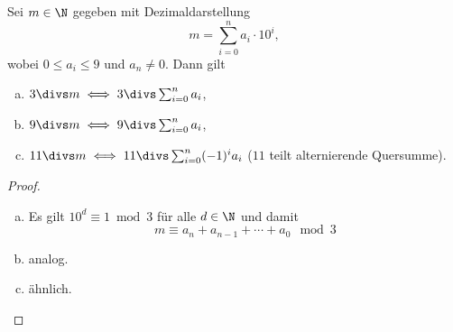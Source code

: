 \begin{st}[Teilbarkeitskriterien] \label{1.16}
	Sei $m \in \N$ gegeben mit Dezimaldarstellung
	\[
		m = \sum_{i=0}^n a_i \cdot 10^i,
	\]
	wobei $0 \le a_i \le 9$ und $a_n \neq 0$.
	Dann gilt
	\begin{enumerate}[a)]
		\item
			$3 \divs m \iff 3 \divs \sum_{i=0}^n a_i$,
		\item
			$9 \divs m \iff 9 \divs \sum_{i=0}^n a_i$,
		\item
			$11 \divs m \iff 11 \divs \sum_{i=0}^n (-1)^i a_i$ ($11$ teilt alternierende Quersumme).
	\end{enumerate}
	\begin{proof}
		\begin{enumerate}[a)]
			\item
				Es gilt $10^d \equiv 1 \bmod 3$ für alle $d \in \N$ und damit
				\[
					m \equiv a_n + a_{n-1} + \dotsb + a_0 \mod 3
				\]
			\item
				analog.
			\item
				ähnlich.
		\end{enumerate}
	\end{proof}
\end{st}
